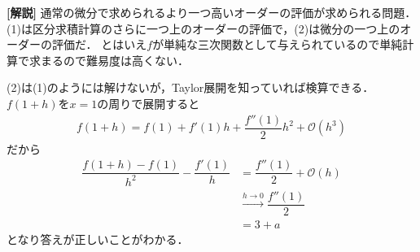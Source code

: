 \documentclass[../../main.tex]{subfiles}
\begin{document}
{\bf [解説]}
通常の微分で求められるより一つ高いオーダーの評価が求められる問題．(1)は区分求積計算のさらに一つ上のオーダーの評価で，(2)は微分の一つ上のオーダーの評価だ．
とはいえ$f$が単純な三次関数として与えられているので単純計算で求まるので難易度は高くない．

(2)は(1)のようには解けないが，Taylor展開を知っていれば検算できる．$f(1+h)$を$x=1$の周りで展開すると
\begin{align}
  f(1+h) = f(1) + f'(1)h + \dfrac{f''(1)}{2}h^2 +\mathcal{O}(h^3)
\end{align}
だから
\begin{align}
  \dfrac{f(1+h) - f(1)}{h^2} - \dfrac{f'(1)}{h}
  &= \dfrac{f''(1)}{2} + \mathcal{O}(h) \\
  &\xrightarrow{h \to 0} \dfrac{f''(1)}{2} \\
  &= 3+a
\end{align}
となり答えが正しいことがわかる．
\end{document}
